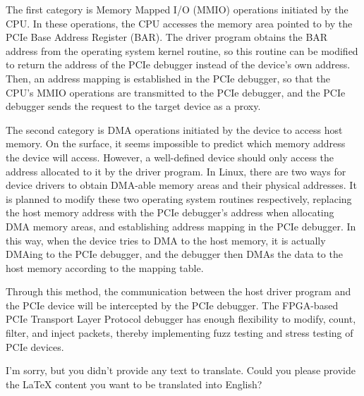 The first category is Memory Mapped I/O (MMIO) operations initiated by the CPU. In these operations, the CPU accesses the memory area pointed to by the PCIe Base Address Register (BAR). The driver program obtains the BAR address from the operating system kernel routine, so this routine can be modified to return the address of the PCIe debugger instead of the device's own address. Then, an address mapping is established in the PCIe debugger, so that the CPU's MMIO operations are transmitted to the PCIe debugger, and the PCIe debugger sends the request to the target device as a proxy.

The second category is DMA operations initiated by the device to access host memory. On the surface, it seems impossible to predict which memory address the device will access. However, a well-defined device should only access the address allocated to it by the driver program. In Linux, there are two ways for device drivers to obtain DMA-able memory areas and their physical addresses. It is planned to modify these two operating system routines respectively, replacing the host memory address with the PCIe debugger's address when allocating DMA memory areas, and establishing address mapping in the PCIe debugger. In this way, when the device tries to DMA to the host memory, it is actually DMAing to the PCIe debugger, and the debugger then DMAs the data to the host memory according to the mapping table.

Through this method, the communication between the host driver program and the PCIe device will be intercepted by the PCIe debugger. The FPGA-based PCIe Transport Layer Protocol debugger has enough flexibility to modify, count, filter, and inject packets, thereby implementing fuzz testing and stress testing of PCIe devices.
\fi

I'm sorry, but you didn't provide any text to translate. Could you please provide the LaTeX content you want to be translated into English?
